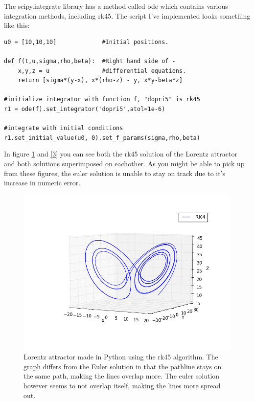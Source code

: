 \documentclass[a4paper,10pt]{article}
\begin{document}
The scipy.integrate library has a method called ode which contains various integration methods, including rk45. The script I've implemented looks something like this:
\begin{lstlisting}
u0 = [10,10,10]             #Initial positions.

def f(t,u,sigma,rho,beta):  #Right hand side of -
    x,y,z = u               #differential equations.
    return [sigma*(y-x), x*(rho-z) - y, x*y-beta*z]

#initialize integrator with function f, "dopri5" is rk45
r1 = ode(f).set_integrator('dopri5',atol=1e-6)

#integrate with initial conditions
r1.set_initial_value(u0, 0).set_f_params(sigma,rho,beta) 
\end{lstlisting}

In figure \ref{2} and \ref{3} you can see both the rk45 solution of the Lorentz attractor and both solutions superimposed on eachother.
As you might be able to pick up from these figures, the euler solution is unable to stay on track due to it's increase in numeric error.

\begin{figure}
 \centering
 \includegraphics[width = \linewidth]{rk4}
 \caption{Lorentz attractor made in Python using the rk45 algorithm. The graph differs from the Euler solution in that the pathline stays on the same path, making the lines overlap more. The euler solution however seems to not overlap itself, making the lines more spread out.}
 \label{2}
\end{figure}
\end{document}
